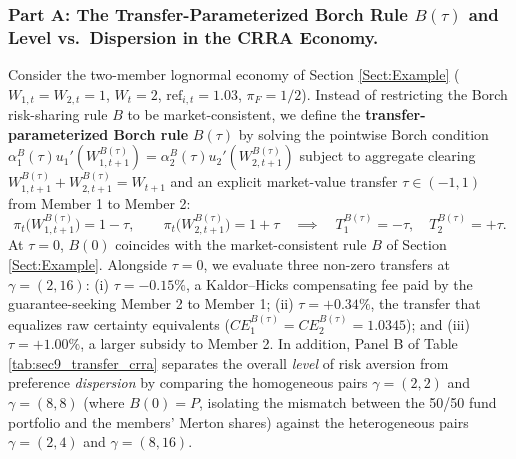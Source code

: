 \documentclass[11pt,a4paper]{article}
\theoremstyle{definition}
\theoremstyle{plain}
\theoremstyle{remark}
\newcommand{\1}{\mathbf{1}}
\begin{document}
\subsubsection*{Part A: The Transfer-Parameterized Borch Rule $B(\tau)$ and Level vs.\ Dispersion in the CRRA Economy.}
Consider the two-member lognormal economy of Section \ref{Sect:Example} ($W_{1,t} = W_{2,t} = 1$, $W_t = 2$, $\text{ref}_{i,t} = 1.03$, $\pi_F = 1/2$). Instead of restricting the Borch risk-sharing rule $B$ to be market-consistent, we define the \textbf{transfer-parameterized Borch rule} $B(\tau)$ by solving the pointwise Borch condition $\alpha_1^B(\tau) u_1'(W_{1,t+1}^{B(\tau)}) = \alpha_2^B(\tau) u_2'(W_{2,t+1}^{B(\tau)})$ subject to aggregate clearing $W_{1,t+1}^{B(\tau)} + W_{2,t+1}^{B(\tau)} = W_{t+1}$ and an explicit market-value transfer $\tau \in (-1, 1)$ from Member 1 to Member 2:
\begin{equation}
    \pi_t\big(W_{1,t+1}^{B(\tau)}\big) = 1 - \tau, \qquad \pi_t\big(W_{2,t+1}^{B(\tau)}\big) = 1 + \tau \quad \implies \quad T_1^{B(\tau)} = -\tau, \quad T_2^{B(\tau)} = +\tau.
    \label{eq:B_tau_def}
\end{equation}
At $\tau = 0$, $B(0)$ coincides with the market-consistent rule $B$ of Section \ref{Sect:Example}. Alongside $\tau = 0$, we evaluate three non-zero transfers at $\gamma = (2, 16)$: (i) $\tau = -0.15\%$, a Kaldor--Hicks compensating fee paid by the guarantee-seeking Member 2 to Member 1; (ii) $\tau = +0.34\%$, the transfer that equalizes raw certainty equivalents ($CE_1^{B(\tau)} = CE_2^{B(\tau)} = 1.0345$); and (iii) $\tau = +1.00\%$, a larger subsidy to Member 2. In addition, Panel B of Table \ref{tab:sec9_transfer_crra} separates the overall \emph{level} of risk aversion from preference \emph{dispersion} by comparing the homogeneous pairs $\gamma = (2, 2)$ and $\gamma = (8, 8)$ (where $B(0) = P$, isolating the mismatch between the 50/50 fund portfolio and the members' Merton shares) against the heterogeneous pairs $\gamma = (2, 4)$ and $\gamma = (8, 16)$.
\end{document}
